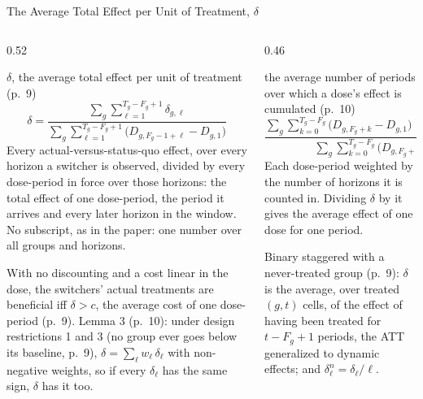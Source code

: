 \documentclass[main.tex]{subfiles}
\begin{document}
\begin{frame}{The Average Total Effect per Unit of Treatment, $\delta$}

  \begin{columns}[T]
    \begin{column}{0.52\textwidth}
      \begin{defbox}{$\delta$, the average total effect per unit of treatment (p.~9)}
        \scriptsize
        \[
          \delta = \frac{\sum_{g}\sum_{\ell=1}^{T_g-F_g+1} \delta_{g,\ell}}
                        {\sum_{g}\sum_{\ell=1}^{T_g-F_g+1} \big(D_{g,F_g-1+\ell}-D_{g,1}\big)}
        \]
        Every actual-versus-status-quo effect, over every horizon a switcher
        is observed, divided by every dose-period in force over those
        horizons: the total effect of one dose-period, the period it arrives
        and every later horizon in the window. No subscript, as in the paper:
        one number over all groups and horizons.
      \end{defbox}

      \smallskip
      \footnotesize With no discounting and a cost linear in the dose, the
      switchers' actual treatments are beneficial iff $\delta > c$, the
      average cost of one dose-period (p.~9). Lemma 3
      (p.~10): under design restrictions 1 and 3 (no group ever goes below
      its baseline, p.~9), $\delta = \sum_\ell w_\ell\, \delta_\ell$ with
      non-negative weights, so if every $\delta_\ell$ has the same sign,
      $\delta$ has it too.
    \end{column}
    \begin{column}{0.46\textwidth}
      \begin{defbox}{the average number of periods over which a dose's effect is cumulated (p.~10)}
        \scriptsize
        \[
          \frac{\sum_g\sum_{k=0}^{T_g-F_g}\big(D_{g,F_g+k}-D_{g,1}\big)\,(T_g-F_g-k+1)}
               {\sum_g\sum_{k=0}^{T_g-F_g}\big(D_{g,F_g+k}-D_{g,1}\big)}
        \]
        Each dose-period weighted by the number of horizons it is counted in.
        Dividing $\delta$ by it gives the average effect of one dose for one
        period.
      \end{defbox}

      \smallskip
      \footnotesize Binary staggered with a never-treated group (p.~9):
      $\delta$ is the average, over treated $(g,t)$ cells, of the effect of
      having been treated for $t-F_g+1$ periods, the ATT generalized to
      dynamic effects; and $\delta^{n}_\ell = \delta_\ell/\ell$.
    \end{column}
  \end{columns}

\end{frame}
\end{document}
